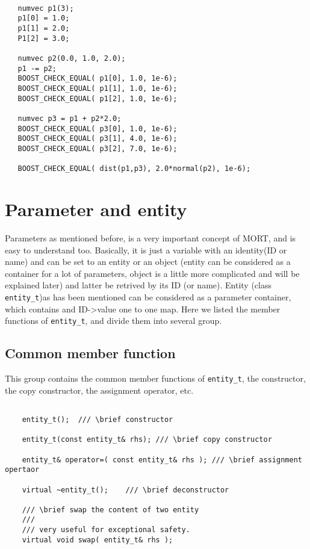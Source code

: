 \documentclass[letterpaper]{book}
\begin{document}
\begin{lstlisting}

   numvec p1(3);
   p1[0] = 1.0;
   p1[1] = 2.0;
   P1[2] = 3.0;

   numvec p2(0.0, 1.0, 2.0);
   p1 -= p2;
   BOOST_CHECK_EQUAL( p1[0], 1.0, 1e-6);
   BOOST_CHECK_EQUAL( p1[1], 1.0, 1e-6);
   BOOST_CHECK_EQUAL( p1[2], 1.0, 1e-6);

   numvec p3 = p1 + p2*2.0;
   BOOST_CHECK_EQUAL( p3[0], 1.0, 1e-6);
   BOOST_CHECK_EQUAL( p3[1], 4.0, 1e-6);
   BOOST_CHECK_EQUAL( p3[2], 7.0, 1e-6);

   BOOST_CHECK_EQUAL( dist(p1,p3), 2.0*normal(p2), 1e-6);

\end{lstlisting}

\section{Parameter and entity}
  Parameters as mentioned before, is a very important concept of MORT, and is easy to understand too. Basically,
it is just a variable with an identity(ID or name) and can be set to an entity or an object (entity can be considered
as a container for a lot of parameters, object is a little more complicated and will be explained later) and
latter be retrived by its ID (or name). Entity (class \lstinline$entity_t$)as has been mentioned can be considered 
as a parameter container, which contains and ID->value one to one map. Here we listed the member functions of 
\lstinline$entity_t$, and divide them into several group.

\subsection{Common member function}
  This group contains the common member functions of \lstinline$entity_t$, the constructor, the copy constructor,
the assignment operator, etc. 
\begin{lstlisting}

    entity_t();  /// \brief constructor
        
    entity_t(const entity_t& rhs); /// \brief copy constructor

    entity_t& operator=( const entity_t& rhs ); /// \brief assignment opertaor

    virtual ~entity_t();    /// \brief deconstructor
        
    /// \brief swap the content of two entity
    ///
    /// very useful for exceptional safety.
    virtual void swap( entity_t& rhs );
\end{lstlisting}
\end{document}

